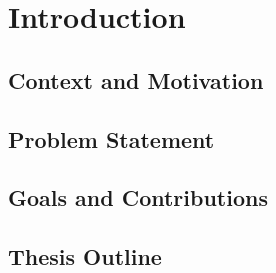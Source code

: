 \chapter{Introduction}
\label{chap:introduction}
\section{Context and Motivation}
\label{sec:context}

\section{Problem Statement}
\label{sec:problemStatment}

\section{Goals and Contributions}
\label{sec:goals}

\section{Thesis Outline}
\label{sec:outline}
